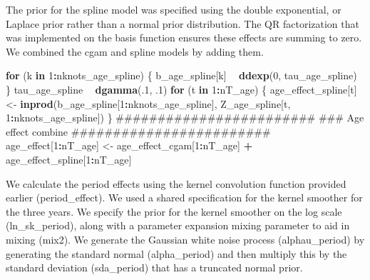 \documentclass[11pt,]{article}
\newenvironment{Shaded}{\begin{snugshade}}{\end{snugshade}}
\newcommand{\KeywordTok}[1]{\textcolor[rgb]{0.13,0.29,0.53}{\textbf{#1}}}
\newcommand{\DecValTok}[1]{\textcolor[rgb]{0.00,0.00,0.81}{#1}}
\newcommand{\StringTok}[1]{\textcolor[rgb]{0.31,0.60,0.02}{#1}}
\newcommand{\ControlFlowTok}[1]{\textcolor[rgb]{0.13,0.29,0.53}{\textbf{#1}}}
\newcommand{\OperatorTok}[1]{\textcolor[rgb]{0.81,0.36,0.00}{\textbf{#1}}}
\newcommand{\NormalTok}[1]{#1}
\begin{document}
The prior for the spline model was specified using the double
exponential, or Laplace prior rather than a normal prior distribution.
The QR factorization that was implemented on the basis function ensures
these effects are summing to zero. We combined the cgam and spline
models by adding them.

\begin{Shaded}
\begin{Highlighting}[]
  \ControlFlowTok{for}\NormalTok{ (k }\ControlFlowTok{in} \DecValTok{1}\OperatorTok{:}\NormalTok{nknots_age_spline) \{}
\NormalTok{    b_age_spline[k] }\OperatorTok{~}\StringTok{ }\KeywordTok{ddexp}\NormalTok{(}\DecValTok{0}\NormalTok{, tau_age_spline)}
\NormalTok{    \}}
\NormalTok{  tau_age_spline }\OperatorTok{~}\StringTok{ }\KeywordTok{dgamma}\NormalTok{(.}\DecValTok{1}\NormalTok{, .}\DecValTok{1}\NormalTok{)}
  \ControlFlowTok{for}\NormalTok{ (t }\ControlFlowTok{in} \DecValTok{1}\OperatorTok{:}\NormalTok{nT_age) \{}
\NormalTok{    age_effect_spline[t] <-}\StringTok{ }\KeywordTok{inprod}\NormalTok{(b_age_spline[}\DecValTok{1}\OperatorTok{:}\NormalTok{nknots_age_spline],}
\NormalTok{                                   Z_age_spline[t, }\DecValTok{1}\OperatorTok{:}\NormalTok{nknots_age_spline])}
\NormalTok{  \}}
\NormalTok{  ########################}
\NormalTok{  ### Age effect combine}
\NormalTok{  ########################}
\NormalTok{  age_effect[}\DecValTok{1}\OperatorTok{:}\NormalTok{nT_age] <-}\StringTok{ }\NormalTok{age_effect_cgam[}\DecValTok{1}\OperatorTok{:}\NormalTok{nT_age] }\OperatorTok{+}
\StringTok{                          }\NormalTok{age_effect_spline[}\DecValTok{1}\OperatorTok{:}\NormalTok{nT_age]}
\end{Highlighting}
\end{Shaded}

We calculate the period effects using the kernel convolution function
provided earlier (period\_effect). We used a shared specification for
the kernel smoother for the three years. We specify the prior for the
kernel smoother on the log scale (ln\_sk\_period), along with a
parameter expansion mixing parameter to aid in mixing (mix2). We
generate the Gaussian white noise process (alphau\_period) by generating
the standard normal (alpha\_period) and then multiply this by the
standard deviation (sda\_period) that has a truncated normal prior.
\end{document}
